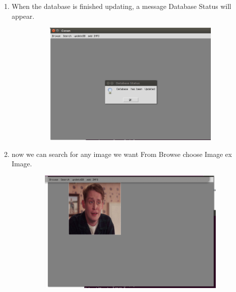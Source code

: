 \documentclass[pdftex,10pt,a4paper,oneside]{article}
\begin{document}
\begin{enumerate}
	
	\pagebreak
			\item 	When the database is finished updating, a message Database Status will appear.
		\begin{figure}[H]
		\centering
		\includegraphics[width=120mm,height=60mm]{fig/3.png}
	\end{figure}
	
	
	
	
	
	
	
	
		\item now we can search for any image we want From Browse choose Image ex Image. 
		
			\begin{figure}[H]
			\centering
			\includegraphics[width=120mm,height=60mm]{fig/4.png}
		\end{figure}



\end{enumerate}
\end{document}
